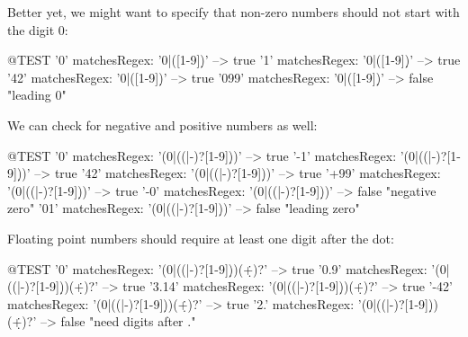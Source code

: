 \documentclass[a4paper,10pt,twoside]{book}
\begin{document}
{Better yet, we might want to specify that non-zero numbers should not start with the digit 0:

\begin{code}{@TEST}
'0' matchesRegex: '0|([1-9]\d*)'     --> true
'1' matchesRegex: '0|([1-9]\d*)'     --> true
'42' matchesRegex: '0|([1-9]\d*)'   --> true
'099' matchesRegex: '0|([1-9]\d*)' --> false    "leading 0"
\end{code}

We can check for negative and positive numbers as well:

\begin{code}{@TEST}
'0' matchesRegex: '(0|((\+|-)?[1-9]\d*))'     --> true
'-1' matchesRegex: '(0|((\+|-)?[1-9]\d*))'   --> true
'42' matchesRegex: '(0|((\+|-)?[1-9]\d*))'   --> true
'+99' matchesRegex: '(0|((\+|-)?[1-9]\d*))' --> true
'-0' matchesRegex: '(0|((\+|-)?[1-9]\d*))'   --> false    "negative zero"
'01' matchesRegex: '(0|((\+|-)?[1-9]\d*))'   --> false    "leading zero"
\end{code}

Floating point numbers should require at least one digit after the dot:

\begin{code}{@TEST}
'0' matchesRegex: '(0|((\+|-)?[1-9]\d*))(\.\d+)?'      --> true
'0.9' matchesRegex: '(0|((\+|-)?[1-9]\d*))(\.\d+)?'   --> true
'3.14' matchesRegex: '(0|((\+|-)?[1-9]\d*))(\.\d+)?' --> true
'-42' matchesRegex: '(0|((\+|-)?[1-9]\d*))(\.\d+)?'  --> true
'2.' matchesRegex: '(0|((\+|-)?[1-9]\d*))(\.\d+)?'     --> false    "need digits after ."
\end{code}


}
\end{document}

